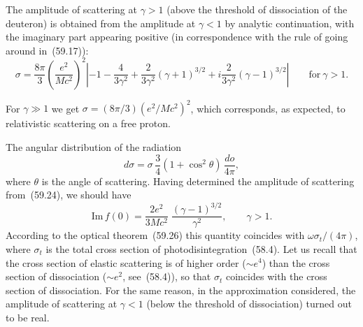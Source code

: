 The amplitude of scattering at $\gamma > 1$ (above the threshold of dissociation of the deuteron) is obtained from the amplitude at $\gamma < 1$ by analytic continuation, with the imaginary part appearing positive (in correspondence with the rule of going around in~(59.17)):
\[
\sigma = \frac{8\pi}{3}\left(\frac{e^2}{Mc^2}\right)^{\!2}\left|-1 - \frac{4}{3\gamma^2} + \frac{2}{3\gamma^2}(\gamma+1)^{3/2} + i\frac{2}{3\gamma^2}(\gamma-1)^{3/2}\right|\qquad\text{for}\ \gamma > 1.
\]

For $\gamma \gg 1$ we get $\sigma = (8\pi/3)(e^2/Mc^2)^2$, which corresponds, as expected, to relativistic scattering on a free proton.

The angular distribution of the radiation
\[
d\sigma = \sigma\,\frac{3}{4}(1 + \cos^2\theta)\,\frac{do}{4\pi},
\]
where $\theta$ is the angle of scattering. Having determined the amplitude of scattering from~(59.24), we should have
\[
\mathrm{Im}\,f(0) = \frac{2e^2}{3Mc^2}\;\frac{(\gamma - 1)^{3/2}}{\gamma^2},\qquad \gamma > 1.
\]
According to the optical theorem~(59.26) this quantity coincides with $\omega\sigma_t/(4\pi)$, where $\sigma_t$ is the total cross section of photodisintegration~(58.4). Let us recall that the cross section of elastic scattering is of higher order ($\sim e^4$) than the cross section of dissociation ($\sim e^2$, see~(58.4)), so that $\sigma_t$ coincides with the cross section of dissociation. For the same reason, in the approximation considered, the amplitude of scattering at $\gamma < 1$ (below the threshold of dissociation) turned out to be real.
